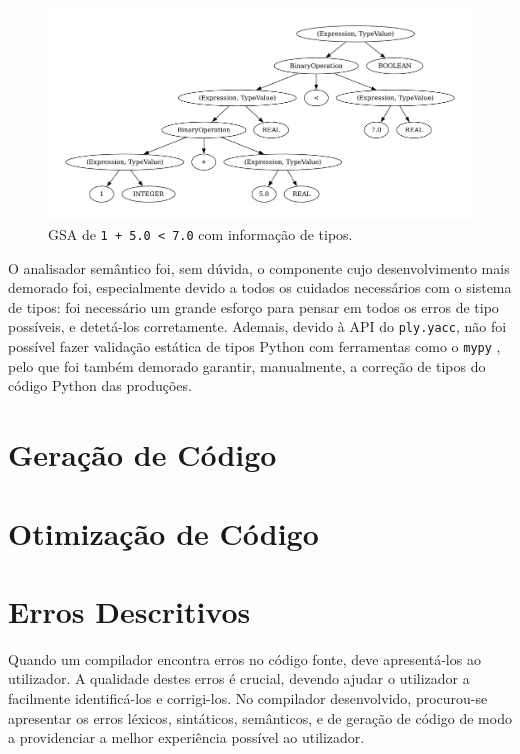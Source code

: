 \documentclass[12pt, a4paper]{article}
\begin{document}
\begin{figure}[H]
    \centering
    \includegraphics[width=\textwidth]{res/expression-types.pdf}
    \caption{GSA de \texttt{1 + 5.0 < 7.0} com informação de tipos.}
\end{figure}

O analisador semântico foi, sem dúvida, o componente cujo desenvolvimento mais demorado foi,
especialmente devido a todos os cuidados necessários com o sistema de tipos: foi necessário um
grande esforço para pensar em todos os erros de tipo possíveis, e detetá-los corretamente. Ademais,
devido à API do \texttt{ply.yacc}, não foi possível fazer validação estática de tipos Python com
ferramentas como o \texttt{mypy} \cite{mypy}, pelo que foi também demorado garantir, manualmente, a
correção de tipos do código Python das produções.

\section{Geração de Código}

\section{Otimização de Código}

\section{Erros Descritivos}

Quando um compilador encontra erros no código fonte, deve apresentá-los ao utilizador. A qualidade
destes erros é crucial, devendo ajudar o utilizador a facilmente identificá-los e corrigi-los. No
compilador desenvolvido, procurou-se apresentar os erros léxicos, sintáticos, semânticos, e de
geração de código de modo a providenciar a melhor experiência possível ao utilizador.
\end{document}
